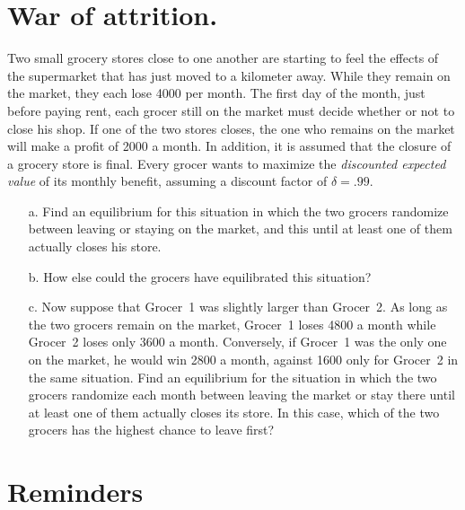 \documentclass{../ape}
\begin{document}
\begin{solution}

\end{solution}

\section{War of attrition.}
Two small grocery stores close to one another are starting to feel the effects of the supermarket that has just moved to a kilometer away. While they remain on the market, they each lose \SI{4000}{\EUR} per month. The first day of the month, just before paying rent, each grocer still on the market must decide whether or not to close his shop. If one of the two stores closes, the one who remains on the market will make a profit of \SI{2000}{\EUR} a month. In addition, it is assumed that the closure of a grocery store is final. Every grocer wants to maximize the \emph{discounted expected value} of its monthly benefit, assuming a discount factor of $\delta = .99$.
\begin{enumerate}
	\item[a.] Find an equilibrium for this situation in which the two grocers randomize between leaving or staying on the market, and this until at least one of them actually closes his store.
	\item[b.] How else could the grocers have equilibrated this situation?
	\item[c.] Now suppose that Grocer~1 was slightly larger than Grocer~2. As long as the two grocers remain on the market, Grocer~1 loses \SI{4800}{\EUR} a month while Grocer~2 loses only \SI{3600}{\EUR} a month. Conversely, if Grocer~1 was the only one on the market, he would win \SI{2800}{\EUR} a month, against \SI{1600}{\EUR} only for Grocer~2 in the same situation. Find an equilibrium for the situation in which the two grocers randomize each month between leaving the market or stay there until at least one of them actually closes its store. In this case, which of the two grocers has the highest chance to leave first?
\end{enumerate}

\nosolution


\newpage

\section*{Reminders}
\end{document}
